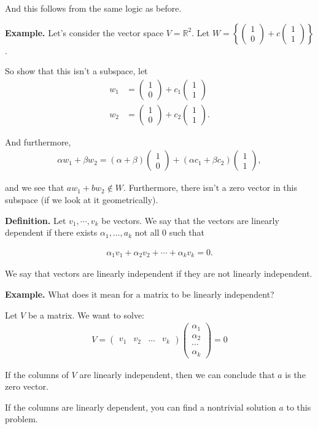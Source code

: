 \documentclass{article}
\newcommand{\mat}[1]{\begin{pmatrix}#1\end{pmatrix}}
\begin{document}
And this follows from the same logic as before.

{\bf Example.} Let's consider the vector space $V = \mathbb{R}^2$.  Let $W = \left\{ \mat{1 \\ 0} + c \mat{1 \\ 1} \right\}$.

So show that this isn't a subspace, let
\begin{align*}
  w_1 &= \mat{1 \\ 0} + c_1 \mat{1 \\ 1} \\
  w_2 &= \mat{1 \\ 0} + c_2 \mat{1 \\ 1}.
\end{align*}

And furthermore,
\begin{align*}
  \alpha w_1 + \beta w_2 = (\alpha + \beta) \mat{1 \\ 0} + (\alpha c_1 + \beta c_2) \mat{1 \\ 1},
\end{align*}

and we see that $a w_1 + b w_2 \not \in W$.  Furthermore, there isn't a zero vector in this subspace (if we look at it geometrically).

{\bf Definition.} Let $v_1, \cdots, v_k$ be vectors.  We say that the vectors are linearly dependent if there exists $\alpha_1, \dots, a_k$ not all 0 such that

\begin{align*}
  \alpha_1 v_1 + \alpha_2 v_2 + \cdots + \alpha_k v_k = 0.
\end{align*}

We say that vectors are linearly independent if they are not linearly independent.

{\bf Example.} What does it mean for a matrix to be linearly independent?

Let $V$ be a matrix.  We want to solve:
\begin{align*}
  V = \mat{v_1 & v_2 & \dots & v_k} \mat{\alpha_1 \\ \alpha_2 \\ \cdots \\ \alpha_k} = 0
\end{align*}

If the columns of $V$ are linearly independent, then we can conclude that $a$ is the zero vector.

If the columns are linearly dependent, you can find a nontrivial solution $a$ to this problem.
\end{document}
